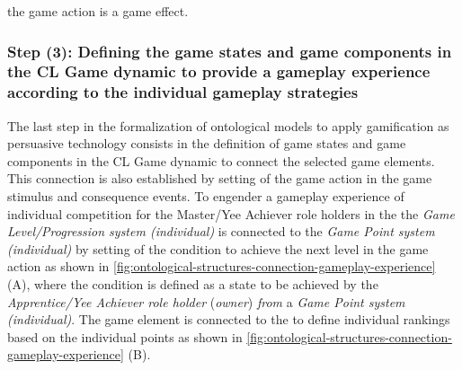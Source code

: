 the game action  is a game effect.

\subsubsection*{Step (3): Defining the game states and game components in the CL Game dynamic to provide a gameplay experience according to the individual gameplay strategies}
 
The last step in the formalization of ontological models to apply gamification as persuasive technology consists in the definition of game states and game components in the CL Game dynamic to connect the selected game elements. This connection is also established by setting of the game action in the game stimulus and consequence events. To engender a gameplay experience of individual competition for the Master/Yee Achiever role holders in the  the \emph{Game Level/Progression system (individual)} is connected to the \emph{Game Point system (individual)} by setting of the condition to achieve the next level in the game action  as shown in \autoref{fig:ontological-structures-connection-gameplay-experience} (A), where the condition  is defined as a state to be achieved by the \emph{Apprentice/Yee Achiever role holder} (\emph{owner}) \emph{from} a \emph{Game Point system (individual)}. The game element  is connected to the  to define individual rankings based on the individual points as shown in \autoref{fig:ontological-structures-connection-gameplay-experience} (B).

